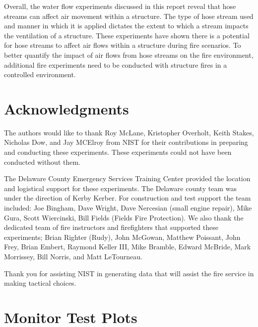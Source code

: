 \documentclass[12pt,oneside]{book}
\begin{document}
Overall, the water flow experiments discussed in this report reveal that hose streams can affect air movement within a structure. The type of hose stream used and manner in which it is applied dictates the extent to which a stream impacts the ventilation of a structure. These experiments have shown there is a potential for hose streams to affect air flows within a structure during fire scenarios. To better quantify the impact of air flows from hose streams on the fire environment, additional fire experiments need to be conducted with structure fires in a controlled environment.

\chapter{Acknowledgments}
\label{chap:acknowledgments}

The authors would like to thank Roy McLane, Kristopher Overholt, Keith Stakes, Nicholas Dow, and Jay MCElroy from NIST for their contributions in preparing and conducting these experiments. These experiments could not have been conducted without them.  

The Delaware County Emergency Services Training Center provided the location and logistical support for these experiments.  The Delaware county team was under the direction of Kerby Kerber.  For construction and test support the team included: Joe Bingham, Dave Wright, Dave Nercesian (small engine repair), Mike Gura, Scott Wiercinski, Bill Fields (Fields Fire Protection).  We also thank the dedicated team of fire instructors and firefighters that supported these experiments; Brian Righter (Rudy), John McGowan, Matthew Poissant, John Frey, Brian Embert, Raymond Keller III, Mike Bramble, Edward McBride, Mark Morrissey, Bill Norris, and Matt LeTourneau.

Thank you for assisting NIST in generating data that will assist the fire service in making tactical choices.





\appendix
\chapter{Monitor Test Plots}
\label{chap:monitor_plots}
\end{document}
